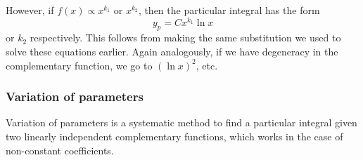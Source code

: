 \documentclass{../../template/note}
\begin{document}
    However, if \(f(x) \propto x^{k_1}\) or \(x^{k_2}\), then the particular integral has the form
    \[
        y_p = Cx^{k_1} \ln x
    \]
    or \(k_2\) respectively. This follows from making the same substitution we used to solve these equations earlier. Again analogously, if we have degeneracy in the complementary function, we go to \((\ln x)^2\), etc.
    
    \subsubsection{Variation of parameters}
    
    Variation of parameters is a systematic method to find a particular integral given two linearly independent complementary functions, which works in the case of non-constant coefficients.
\end{document}
